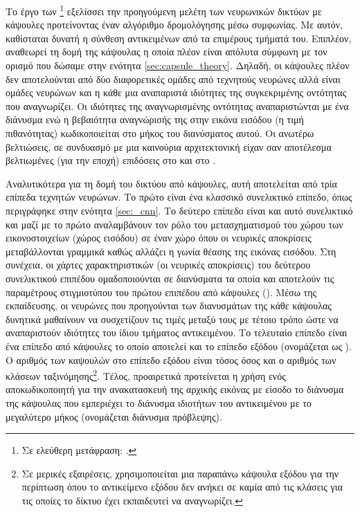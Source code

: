 Το έργο των \footnote{Σε ελεύθερη μετάφραση: .} \cite{sabour2017dynamic} εξελίσσει την προηγούμενη μελέτη των νευρωνικών δικτύων με κάψουλες προτείνοντας έναν αλγόριθμο δρομολόγησης μέσω συμφωνίας. Με αυτόν, καθίσταται δυνατή η σύνθεση αντικειμένων από τα επιμέρους τμήματά του. Επιπλέον, αναθεωρεί τη δομή της κάψουλας η οποία πλέον είναι απόλυτα σύμφωνη με τον ορισμό που δώσαμε στην ενότητα \ref{sec:capsule_theory}. Δηλαδή, οι κάψουλες πλέον δεν αποτελούνται από δύο διαφορετικές ομάδες από τεχνητούς νευρώνες αλλά είναι ομάδες νευρώνων και η κάθε μια αναπαριστά ιδιότητες της συγκεκριμένης οντότητας που αναγνωρίζει. Οι ιδιότητες της αναγνωρισμένης οντότητας αναπαριστώνται με ένα διάνυσμα ενώ η βεβαιότητα αναγνώρισής της στην εικόνα εισόδου (η τιμή πιθανότητας) κωδικοποιείται στο μήκος του διανύσματος αυτού. Οι ανωτέρω βελτιώσεις, σε συνδυασμό με μια καινούρια αρχιτεκτονική είχαν σαν αποτέλεσμα βελτιωμένες (για την εποχή) επιδόσεις στο \cite{lecun1998gradientMNIST} και στο \cite{sabour2017dynamic}.\par

Αναλυτικότερα για τη δομή του δικτύου από κάψουλες, αυτή αποτελείται από τρία επίπεδα τεχνητών νευρώνων. Το πρώτο είναι ένα κλασσικό συνελικτικό επίπεδο, όπως περιγράφηκε στην ενότητα \ref{sec:_cnn}. Το δεύτερο επίπεδο είναι και αυτό συνελικτικό και μαζί με το πρώτο αναλαμβάνουν τον ρόλο του μετασχηματισμού του χώρου των εικονοστοιχείων (χώρος εισόδου) σε έναν χώρο όπου οι νευρικές αποκρίσεις μεταβάλλονται γραμμικά καθώς αλλάζει η γωνία θέασης της εικόνας εισόδου. Στη συνέχεια, οι χάρτες χαρακτηριστικών (οι νευρικές αποκρίσεις) του δεύτερου συνελικτικού επιπέδου ομαδοποιούνται σε διανύσματα τα οποία και αποτελούν τις παραμέτρους στιγμιοτύπου του πρώτου επιπέδου από κάψουλες (). Μέσω της εκπαί\-δευσης, οι νευρώνες που προηγούνται των διανυσμάτων της κάθε κάψουλας δυνητικά μαθαίνουν να συσχετίζουν τις τιμές μεταξύ τους με τέτοιο τρόπο ώστε να αναπαριστούν ιδιότητες του ίδιου τμήματος αντικειμένου. Το τελευταίο επίπεδο είναι ένα επίπεδο από κάψουλες το οποίο αποτελεί και το επίπεδο εξόδου (ονομάζεται ως ). Ο αριθμός των καψουλών στο επίπεδο εξόδου είναι τόσος όσος και ο αριθμός των κλάσεων ταξινόμησης\footnote{Σε μερικές εξαιρέσεις, χρησιμοποιείται μια παραπάνω κάψουλα εξόδου για την περίπτωση όπου το αντικείμενο εξόδου δεν ανήκει σε καμία από τις κλάσεις για τις οποίες το δίκτυο έχει εκπαιδευτεί να αναγνωρίζει.}. Τέλος, προαιρετικά προτείνεται η χρήση ενός αποκωδικοποιητή για την ανακατασκευή της αρχικής εικόνας με είσοδο το διάνυσμα της κάψουλας που εμπεριέχει το διάνυσμα ιδιοτήτων του αντικειμένου με το μεγαλύτερο μήκος (ονομάζεται διάνυσμα πρόβλεψης).\par

